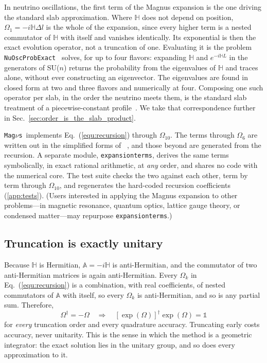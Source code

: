 \documentclass[final,5p,times,twocolumn,sort,compress]{elsarticle}
\makeatletter
\newcommand{\eq}{Eq.}
\DeclareRobustCommand{\_}{%
  \ifmmode\nfss@text{\textunderscore}\else\textunderscore\allowbreak\fi}
\providecommand{\Ref}{}
\newcommand{\equ}[1]{\eq~(\ref{equ:#1})}
\newcommand{\magnus}{{\tt Mag}\ensuremath{\nu}{\tt s}}
\makeatother
\begin{document}
In neutrino oscillations, the first term of the Magnus expansion is the one driving the standard slab approximation. Where $\mathbb{H}$ does not depend on position, $\Omega_1 = -i\mathbb{H}\Delta l$ is the whole of the expansion, since every higher term is a nested commutator of $\mathbb{H}$ with itself and vanishes identically. Its exponential is then the exact evolution operator, not a truncation of one. Evaluating it is the problem {\tt NuOscProbExact}\ \cite{NuOscProbExact, Bustamante:2019ggq} solves, for up to four flavors: expanding $\mathbb{H}$ and $e^{-i\mathbb{H}L}$ in the generators of SU($n$) returns the probability from the eigenvalues of $\mathbb{H}$ and traces alone, without ever constructing an eigenvector. The eigenvalues are found in closed form at two and three flavors and numerically at four. Composing one such operator per slab, in the order the neutrino meets them, is the standard slab treatment of a piecewise-constant profile~\cite{Akhmedov:1988kd, Krastev:1989ix, Akhmedov:1998ui}. We take that correspondence further in Sec.~\ref{sec:order_is_the_slab_product}.

\magnus\ implements \equ{recursion} through $\Omega_{10}$. The terms through $\Omega_6$ are written out in the simplified forms of \Ref\ \cite{Blanes:2008xlr}, and those beyond are generated from the recursion. A separate module, {\tt expansionterms}, derives the same terms symbolically, in exact rational arithmetic, at \emph{any} order, and shares no code with the numerical core. The test suite checks the two against each other, term by term through $\Omega_{10}$, and regenerates the hard-coded recursion coefficients (\ref{app:tests}). (Users interested in applying the Magnus expansion to other problems---in magnetic resonance, quantum optics, lattice gauge theory, or condensed matter---may repurpose {\tt expansionterms}.)


\subsection{Truncation is exactly unitary}
\label{sec:unitarity}

Because $\mathbb{H}$ is Hermitian, $\mathbb{A} = -i\mathbb{H}$ is anti-Hermitian, and the commutator of two anti-Hermitian matrices is again anti-Hermitian. Every $\Omega_k$ in \equ{recursion} is a combination, with real coefficients, of nested commutators of $\mathbb{A}$ with itself, so every $\Omega_k$ is anti-Hermitian, and so is any partial sum. Therefore,
\begin{equation}
 \label{equ:unitary}
 \Omega^\dagger = -\Omega
 \quad\Longrightarrow\quad
 \left[\exp(\Omega)\right]^\dagger \exp(\Omega) = \mathbb{1}
\end{equation}
for \emph{every} truncation order and every quadrature accuracy. Truncating early costs accuracy, never unitarity. This is the sense in which the method is a geometric integrator: the exact solution lies in the unitary group, and so does every approximation to it.
\end{document}
